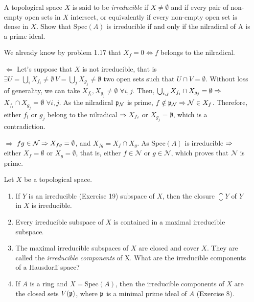 \begin{ex}
A topological space $X$ is said to be \textit{irreducible} if $X \neq \emptyset$ and if every pair of non-empty open sets in $X$ intersect, or equivalently if every non-empty open set is dense in $X$. Show that Spec$(A)$ is irreducible if and only if the nilradical of A is a prime ideal.
\end{ex}

\begin{sol}
We already know by problem 1.17 that $X_f = 0 \iff f$ belongs to the nilradical. 

\noindent $\boxed{\Leftarrow}$ Let's suppose that $X$ is not irreducible, that is $\exists U = \bigcup_i X_{f_i} \neq \emptyset \, V = \bigcup_j X_{g_j} \neq \emptyset$ two open sets such that $U \cap V = \emptyset$. Without loss of generality, we can take $X_{f_i}, X_{g_j} \neq \emptyset \, \, \forall i,j$. Then, $\bigcup_{i,j} X_{f_i} \cap X_{g_j} = \emptyset \Rightarrow$ $X_{f_i} \cap X_{g_j} = \emptyset \, \, \forall i,j$. As the nilradical $\mathfrak{p}_{\mathcal{N}}$ is prime, $f \notin \mathfrak{p}_{\mathcal{N}} \Rightarrow \mathcal{N} \in X_f$. Therefore, either $f_i$ or $g_j$ belong to the nilradical $\Rightarrow X_{f_i}$ or $X_{g_j} = \emptyset$, which is a contradiction.

\noindent $\boxed{\Rightarrow}$ $fg \in \mathcal{N} \Rightarrow X_{fg} = \emptyset$, and $X_{fg} = X_f \cap X_g$. As Spec$(A)$ is irreducible $\Rightarrow$ either $X_f = \emptyset$ or $X_g = \emptyset$, that is, either $f \in \mathcal{N}$ or $g \in \mathcal{N}$, which proves that $\mathcal{N}$ is prime.
\end{sol}

\begin{ex}
	Let $X$ be a topological space.
	\begin{enumerate}[]
		\item If $Y$ is an irreducible (Exercise 19) subspace of $X$, then the closure $\closure{Y}$ of $Y$ in $X$ is irreducible.
		\item Every irreducible subspace of $X$ is contained in a maximal irreducible subspace.
		\item The maximal irreducible subspaces of $X$ are closed and cover $X$. They are called the \textit{irreducible components} of X. What are the irreducible components of a Hausdorff space?
		\item If $A$ is a ring and $X = \text{Spec}(A)$, then the irreducible components of $X$ are the closed sets $V(\mathfrak{p})$, where $\mathfrak{p}$ is a minimal prime ideal of $A$ (Exercise 8).
\end{enumerate}
\end{ex}


